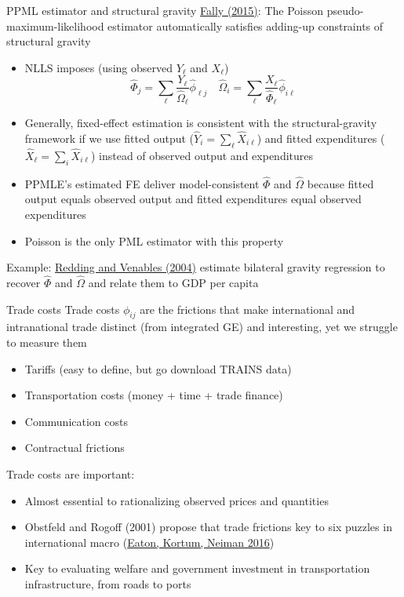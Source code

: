 \documentclass[10pt,notes=hide]{beamer}
\begin{document}
\begin{frame}{PPML estimator and structural gravity}
\href{https://doi.org/10.1016/j.jinteco.2015.05.005}{Fally (2015)}:
The Poisson pseudo-maximum-likelihood estimator automatically satisfies adding-up constraints of structural gravity
\begin{itemize}
\item 
NLLS imposes (using observed $Y_{\ell}$ and $X_{\ell}$)
\begin{equation*}
\hat{\Phi}_j = \sum_{\ell} \frac{Y_{\ell}}{\hat{\Omega}_{\ell}} \hat{\phi}_{\ell j}
\quad
\hat{\Omega}_i = \sum_{\ell} \frac{X_{\ell}}{\hat{\Phi}_{\ell}} \hat{\phi}_{i \ell}
\end{equation*}
\item 
Generally, fixed-effect estimation is consistent with the structural-gravity framework
if we use fitted output ($\hat{Y}_{i} = \sum_{\ell} \hat{X}_{i\ell}$) and fitted expenditures ($\hat{X}_{\ell} = \sum_{i} \hat{X}_{i\ell}$)
instead of observed output and expenditures
\item 
PPMLE's estimated FE deliver model-consistent $\hat{\Phi}$ and $\hat{\Omega}$ because
fitted output equals observed output and fitted expenditures equal observed expenditures
\item
Poisson is the only PML estimator with this property
\end{itemize}
Example:
\href{https://ideas.repec.org/a/eee/inecon/v62y2004i1p53-82.html}{Redding and Venables (2004)}
estimate bilateral gravity regression to recover $\hat{\Phi}$ and $\hat{\Omega}$
and relate them to GDP per capita
\end{frame}
\begin{frame}{Trade costs}
Trade costs $\phi_{ij}$ are the frictions that make international and intranational trade distinct (from integrated GE) and interesting, yet we struggle to measure them
\begin{itemize}
	\item Tariffs (easy to define, but go download TRAINS data)
	\item Transportation costs (money + time + trade finance)
	\item Communication costs
	\item Contractual frictions
\end{itemize}
Trade costs are important:
\begin{itemize}
	\item Almost essential to rationalizing observed prices and quantities
	\item Obstfeld and Rogoff (2001) propose that trade frictions key to six puzzles in international macro (\href{https://www.sciencedirect.com/science/article/pii/S0165188916301014}{Eaton, Kortum, Neiman 2016})
	\item Key to evaluating welfare and government investment in transportation infrastructure, from roads to ports
\end{itemize}
\end{frame}
\end{document}
